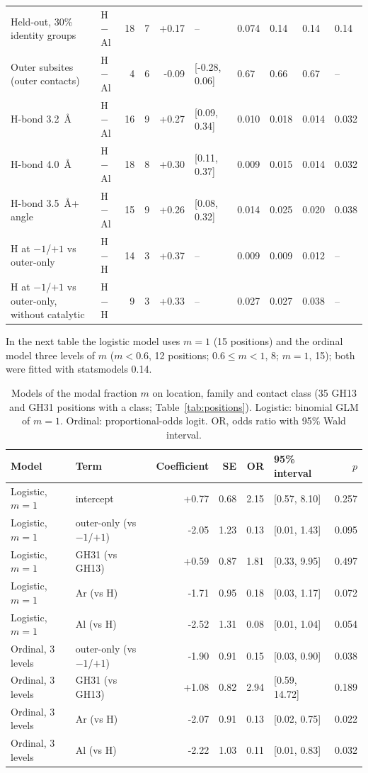 \documentclass[preprint,12pt]{elsarticle}
\begin{document}
\begin{table}[h]
\begin{tabular}{p{3.5cm}lrrrlllll}
Held-out, 30\% identity groups & H$-$Al & 18 & 7 & +0.17 & -- & 0.074 & 0.14 & 0.14 & 0.14\\
Outer subsites (outer contacts) & H$-$Al & 4 & 6 & -0.09 & [-0.28, 0.06] & 0.67 & 0.66 & 0.67 & --\\
H-bond 3.2~\AA & H$-$Al & 16 & 9 & +0.27 & [0.09, 0.34] & 0.010 & 0.018 & 0.014 & 0.032\\
H-bond 4.0~\AA & H$-$Al & 18 & 8 & +0.30 & [0.11, 0.37] & 0.009 & 0.015 & 0.014 & 0.032\\
H-bond 3.5~\AA + angle & H$-$Al & 15 & 9 & +0.26 & [0.08, 0.32] & 0.014 & 0.025 & 0.020 & 0.038\\
H at $-1$/$+1$ vs outer-only & H$-$H & 14 & 3 & +0.37 & -- & 0.009 & 0.009 & 0.012 & --\\
H at $-1$/$+1$ vs outer-only, without catalytic & H$-$H & 9 & 3 & +0.33 & -- & 0.027 & 0.027 & 0.038 & --\\
\bottomrule
\end{tabular}
\end{table}

In the next table the logistic model uses $m = 1$ (15 positions) and the ordinal model three levels of $m$ ($m < 0.6$, 12 positions; $0.6 \le m < 1$, 8; $m = 1$, 15); both were fitted with statsmodels 0.14.

\begin{table}[h]
\centering\scriptsize\setlength{\tabcolsep}{3pt}
\caption{Models of the modal fraction $m$ on location, family and contact class (35 GH13 and GH31 positions with a class; Table~\ref{tab:positions}). Logistic: binomial GLM of $m = 1$. Ordinal: proportional-odds logit. OR, odds ratio with 95\% Wald interval.}
\label{tab:model}
\begin{tabular}{llrrrlr}
\toprule
Model & Term & Coefficient & SE & OR & 95\% interval & $p$\\
\midrule
Logistic, $m = 1$ & intercept & +0.77 & 0.68 & 2.15 & [0.57, 8.10] & 0.257\\
Logistic, $m = 1$ & outer-only (vs $-1$/$+1$) & -2.05 & 1.23 & 0.13 & [0.01, 1.43] & 0.095\\
Logistic, $m = 1$ & GH31 (vs GH13) & +0.59 & 0.87 & 1.81 & [0.33, 9.95] & 0.497\\
Logistic, $m = 1$ & Ar (vs H) & -1.71 & 0.95 & 0.18 & [0.03, 1.17] & 0.072\\
Logistic, $m = 1$ & Al (vs H) & -2.52 & 1.31 & 0.08 & [0.01, 1.04] & 0.054\\
Ordinal, 3 levels & outer-only (vs $-1$/$+1$) & -1.90 & 0.91 & 0.15 & [0.03, 0.90] & 0.038\\
Ordinal, 3 levels & GH31 (vs GH13) & +1.08 & 0.82 & 2.94 & [0.59, 14.72] & 0.189\\
Ordinal, 3 levels & Ar (vs H) & -2.07 & 0.91 & 0.13 & [0.02, 0.75] & 0.022\\
Ordinal, 3 levels & Al (vs H) & -2.22 & 1.03 & 0.11 & [0.01, 0.83] & 0.032\\
\bottomrule
\end{tabular}
\end{table}
\end{document}
